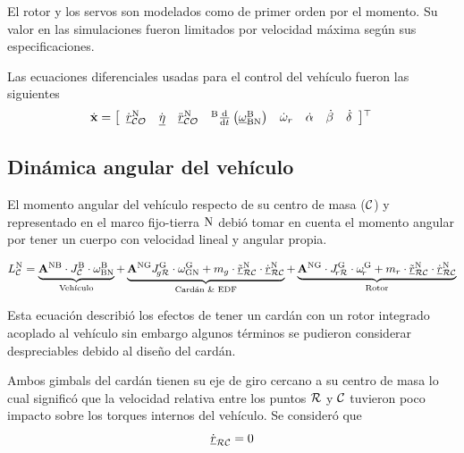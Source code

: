 El rotor y los servos son modelados como de primer orden por el momento. Su valor en las simulaciones fueron limitados por velocidad máxima según sus especificaciones.

Las ecuaciones diferenciales usadas para el control del vehículo fueron las siguientes
\begin{equation} \label{eq:ssDiffVariables3D}
	\dot{\mathbf{x}} = \left[
	\begin{array}{cccccccc}
		\dot{{ \underline{r} }}_{\mathcal{CO}}^{\mathrm{N}}& \dot{{ \underline{\eta} }} &\ddot{{ \underline{r} }}_{\mathcal{CO}}^{\mathrm{N}} & {}^{\mathrm{B}}\frac{\textrm{d} }{\textrm{d} t} \left({ \underline{\omega} }_{\mathrm{BN}}^{\mathrm{B}} \right) & \dot{\omega}_r & \dot{\alpha} & \dot{\beta} & \dot{\delta}
	\end{array}\right] \!^{\top}\!~
\end{equation}


\subsection{Dinámica angular del vehículo}\label{ssec:ecuacionangular}

El momento angular del vehículo respecto de su centro de masa ($\mathcal{C}$) y representado en el marco fijo-tierra $\mathrm{N}$ debió tomar en cuenta el momento angular por tener un cuerpo con velocidad lineal y angular propia. 

\begin{equation}
		L_{\mathcal{C}}^{\mathrm{N}} = \underbrace{\mathbf{A}^{\mathrm{{NB}}} \cdot J_{\mathcal{C}}^{\mathrm{B}} \cdot \omega_{\mathrm{BN}}^{\mathrm{B}}}_{\text{Vehículo}} +
		\underbrace{\mathbf{A}^{\mathrm{{NG}}}J_{\!g\mathcal{R}}^{\mathrm{G}} \cdot \omega_{\mathrm{GN}}^{\mathrm{G}} +
		 m_{g}\cdot \tilde{{ \underline{r} }}^{\mathrm{N}}_{\mathcal{RC}} \cdot\dot{{ \underline{r} }}^{\mathrm{N}}_{\mathcal{RC}} }_\text{Cardán \& EDF} + \underbrace{ \mathbf{A}^{\mathrm{NG}} \cdot J_{\!r\mathcal{R}}^{\mathrm{G}} \cdot \omega_{\!r}^{\mathrm{G}} + m_{r}\cdot \tilde{{ \underline{r} }}^{\mathrm{N}}_{\mathcal{RC}} \cdot\dot{{ \underline{r} }}^{\mathrm{N}}_{\mathcal{RC}}}_\text{Rotor}
\end{equation}

Esta ecuación describió los efectos de tener un cardán con un rotor integrado acoplado al vehículo sin embargo algunos términos se pudieron considerar despreciables debido al diseño del cardán. 

Ambos gimbals del cardán tienen su eje de giro cercano a su centro de masa lo cual significó que la velocidad relativa entre los puntos $\mathcal{R}$ y $\mathcal{C}$ tuvieron poco impacto sobre los torques internos del vehículo. Se consideró que
\begin{equation}
\dot{{ \underline{r} }}_{\mathcal{RC}}  = 0
\end{equation}

